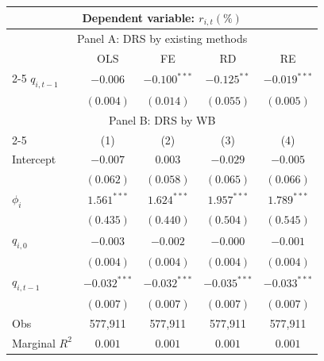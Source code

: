 \documentclass[
]{article}
\author{}
\date{\vspace{-2.5em}}
\begin{document}
\begin{tabular}{lcccc}
  \toprule \multicolumn{5}{c}{Dependent variable: $r_{i,t} (\%)$} \\
 \hline
    \multicolumn{5}{c}{Panel A: DRS by existing methods} \\
 
 & OLS & FE & RD & RE \\
 
 \cmidrule(l){2-5} 
 $q_{i,t-1}$ & $-0.006$ & $-0.100^{***}$ & $-0.125^{**}$ & $-0.019^{***}$ \\ 
   \vspace{5pt} 
 & $(0.004)$ & $(0.014)$ & $(0.055)$ & $(0.005)$ \\ 
   \hline \multicolumn{5}{c}{Panel B: DRS by WB} \\
 
 \cmidrule(l){2-5} & (1) & (2) & (3) & (4) \vspace{5pt} \\
Intercept & $-0.007$ & $0.003$ & $-0.029$ & $-0.005$ \\ 
   & $(0.062)$ & $(0.058)$ & $(0.065)$ & $(0.066)$ \\ 
  $\phi_i$ & $1.561^{***}$ & $1.624^{***}$ & $1.957^{***}$ & $1.789^{***}$ \\ 
   & $(0.435)$ & $(0.440)$ & $(0.504)$ & $(0.545)$ \\ 
  $q_{i,0}$ & $-0.003$ & $-0.002$ & $-0.000$ & $-0.001$ \\ 
   & $(0.004)$ & $(0.004)$ & $(0.004)$ & $(0.004)$ \\ 
  $q_{i,t-1}$ & $-0.032^{***}$ & $-0.032^{***}$ & $-0.035^{***}$ & $-0.033^{***}$ \\ 
   \vspace{5pt} 
 & $(0.007)$ & $(0.007)$ & $(0.007)$ & $(0.007)$ \\ 
  Obs & 577,911 & 577,911 & 577,911 & 577,911 \\ 
  Marginal $R^2$ & $0.001$ & $0.001$ & $0.001$ & $0.001$ \\ 
   \bottomrule 
\end{tabular}
\end{document}
